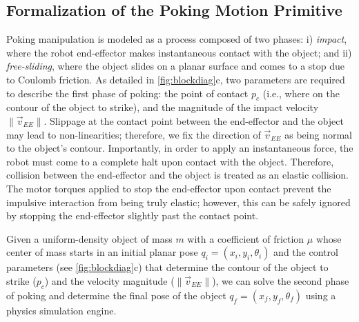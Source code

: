 \subsection{Formalization of the Poking Motion Primitive}\label{sec:poking}

Poking manipulation is modeled as a process composed of two phases: i) \textsl{impact}, where the robot end-effector makes instantaneous contact with the object; and ii) \textsl{free-sliding}, where the object slides on a planar surface and comes to a stop due to Coulomb friction.
As detailed in \cref{fig:blockdiag}c, two parameters are required to describe the first phase of poking: the point of contact $p_c$ (i.e., where on the contour of the object to strike), and the magnitude of the impact velocity $\|\vec{v}_{EE}\|$.
Slippage at the contact point between the end-effector and the object may lead to non-linearities; therefore, we fix the direction of $\vec{v}_{EE}$ as being normal to the object's contour.
Importantly, in order to apply an instantaneous force, the robot must come to a complete halt upon contact with the object. Therefore, collision between the end-effector and the object is treated as an elastic collision. The motor torques applied to stop the end-effector upon contact prevent the impulsive interaction from being truly elastic; however, this can be safely ignored by stopping the end-effector slightly past the contact point.

Given a uniform-density object of mass $m$ with a coefficient of friction $\mu$ whose center of mass starts in an initial planar pose $q_i = (x_i, y_i, \theta_i)$  and the control parameters (see \cref{fig:blockdiag}c) that determine the contour of the object to strike ($p_c$) and the velocity magnitude ($\|\vec{v}_{EE}\|$), we can solve the second phase of poking and determine the final pose of the object $q_f = (x_f, y_f, \theta_f)$ using a physics simulation engine.
